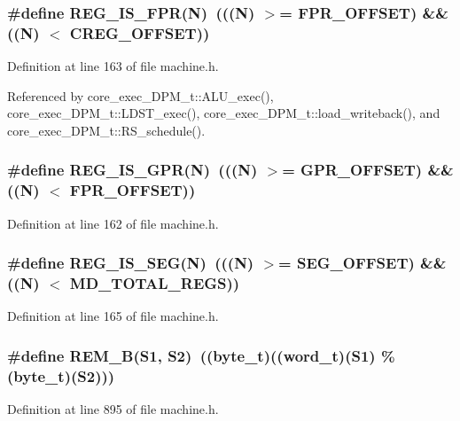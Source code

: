 \subsubsection[{REG\_\-IS\_\-FPR}]{\setlength{\rightskip}{0pt plus 5cm}\#define REG\_\-IS\_\-FPR(N)~(((N) $>$= FPR\_\-OFFSET) \&\& ((N) $<$ CREG\_\-OFFSET))}\label{machine_8h_68982a77353744eb45beec6d4075bb4b}




Definition at line 163 of file machine.h.

Referenced by core\_\-exec\_\-DPM\_\-t::ALU\_\-exec(), core\_\-exec\_\-DPM\_\-t::LDST\_\-exec(), core\_\-exec\_\-DPM\_\-t::load\_\-writeback(), and core\_\-exec\_\-DPM\_\-t::RS\_\-schedule().
\subsubsection[{REG\_\-IS\_\-GPR}]{\setlength{\rightskip}{0pt plus 5cm}\#define REG\_\-IS\_\-GPR(N)~(((N) $>$= GPR\_\-OFFSET) \&\& ((N) $<$ FPR\_\-OFFSET))}\label{machine_8h_847c0d2190d42a64c52ad9b8e8b514dc}




Definition at line 162 of file machine.h.
\subsubsection[{REG\_\-IS\_\-SEG}]{\setlength{\rightskip}{0pt plus 5cm}\#define REG\_\-IS\_\-SEG(N)~(((N) $>$= SEG\_\-OFFSET) \&\& ((N) $<$ MD\_\-TOTAL\_\-REGS))}\label{machine_8h_f65d0e1379202c613a27b4df6da1d3bf}




Definition at line 165 of file machine.h.
\subsubsection[{REM\_\-B}]{\setlength{\rightskip}{0pt plus 5cm}\#define REM\_\-B(S1, \/  S2)~(({\bf byte\_\-t})(({\bf word\_\-t})(S1) \% ({\bf byte\_\-t})(S2)))}\label{machine_8h_cb5d978f2b8380e95993357ac2533576}




Definition at line 895 of file machine.h.
